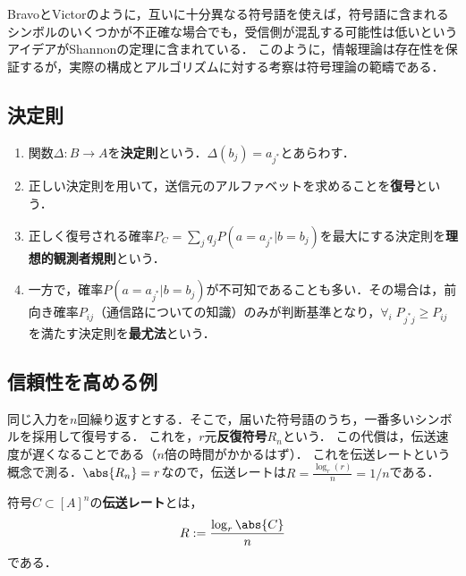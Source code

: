 \documentclass[uplatex,dvipdfmx]{jsreport}
\begin{document}
\begin{tcolorbox}[colframe=ForestGreen, colback=ForestGreen!10!white,breakable,colbacktitle=ForestGreen!40!white,coltitle=black,fonttitle=\bfseries\sffamily,
title=]
BravoとVictorのように，互いに十分異なる符号語を使えば，符号語に含まれるシンボルのいくつかが不正確な場合でも，受信側が混乱する可能性は低いというアイデアがShannonの定理に含まれている．
このように，情報理論は存在性を保証するが，実際の構成とアルゴリズムに対する考察は符号理論の範疇である．
\end{tcolorbox}

\subsection{決定則}

\begin{definition}\mbox{}
    \begin{enumerate}
        \item 関数$\Delta:B\to A$を\textbf{決定則}という．$\Delta(b_j)=a_{j^*}$とあらわす．
        \item 正しい決定則を用いて，送信元のアルファベットを求めることを\textbf{復号}という．
        \item 正しく復号される確率$P_C=\sum_{j}q_jP(a=a_{j^*}|b=b_j)$を最大にする決定則を\textbf{理想的観測者規則}という．
        \item 一方で，確率$P(a=a_{j^*}|b=b_j)$が不可知であることも多い．その場合は，前向き確率$P_{ij}$（通信路についての知識）のみが判断基準となり，$\forall_{i}\;P_{j^*j}\ge P_{ij}$を満たす決定則を\textbf{最尤法}という．
    \end{enumerate}
\end{definition}

\subsection{信頼性を高める例}

\begin{example}
    同じ入力を$n$回繰り返すとする．そこで，届いた符号語のうち，一番多いシンボルを採用して復号する．
    これを，$r$元\textbf{反復符号}$R_n$という．
    この代償は，伝送速度が遅くなることである（$n$倍の時間がかかるはず）．
    これを伝送レートという概念で測る．$\abs{R_n}=r$なので，伝送レートは$R=\frac{\log_r(r)}{n}=1/n$である．
\end{example}

\begin{definition}
    符号$C\subset [A]^n$の\textbf{伝送レート}とは，
    \[R:=\frac{\log_r\abs{C}}{n}\]
    である．
\end{definition}
\end{document}
